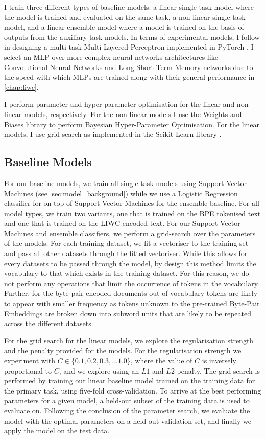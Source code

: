 I train three different types of baseline models: a linear single-task model where the model is trained and evaluated on the same task, a non-linear single-task model, and a linear ensemble model where a model is trained on the basis of outputs from the auxiliary task models.
In terms of experimental models, I follow \citet{Waseem:2018} in designing a multi-task Multi-Layered Perceptron implemented in PyTorch \citep{Paszke:2019}. I select an MLP over more complex neural networks architectures like Convolutional Neural Networks and Long-Short Term Memory networks due to the speed with which MLPs are trained along with their general performance in \cref{chap:liwc}.

I perform parameter and hyper-parameter optimisation for the linear and non-linear models, respectively.
For the non-linear models I use the Weights and Biases library \citep{Wandb} to perform Bayesian Hyper-Parameter Optimisation.
For the linear models, I use grid-search as implemented in the Scikit-Learn library \citep{Pedregosa:2011}.

\subsection{Baseline Models}

For our baseline models, we train all single-task models using Support Vector Machines (see \autoref{sec:model_background}) while we use a Logistic Regression classifier for on top of Support Vector Machines for the ensemble baseline. For all model types, we train two variants, one that is trained on the BPE tokenised text and one that is trained on the LIWC encoded text. For our Support Vector Machines and ensemble classifiers, we perform a grid-search over the parameters of the models. For each training dataset, we fit a vectoriser to the training set and pass all other datasets through the fitted vectoriser. While this allows for every datasets to be passed through the model, by design this method limits the vocabulary to that which exists in the training dataset. For this reason, we do not perform any operations that limit the occurrence of tokens in the vocabulary. Further, for the byte-pair encoded documents out-of-vocabulary tokens are likely to appear with smaller frequency as tokens unknown to the pre-trained Byte-Pair Embeddings are broken down into subword units that are likely to be repeated across the different datasets.

For the grid search for the linear models, we explore the regularisation strength and the penalty provided for the models. For the regularisation strength we experiment with $C\in \{0.1, 0.2, 0.3, \ldots 1.0\}$, where the value of $C$ is inversely proportional to $C$, and we explore using an $L1$ and $L2$ penalty. The grid search is performed by training our linear baseline model trained on the training data for the primary task, using five-fold cross-validation. To arrive at the best performing parameters for a given model, a held-out subset of the training data is used to evaluate on. Following the conclusion of the parameter search, we evaluate the model with the optimal parameters on a held-out validation set, and finally we apply the model on the test data.

